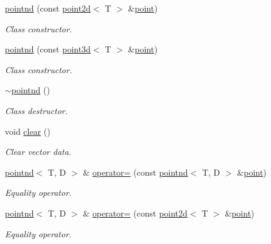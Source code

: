\begin{DoxyCompactItemize}
\hyperlink{classacme_1_1pointnd_a79fb8863dcfbca679747b145dae7f0d8}{pointnd} (const \hyperlink{classacme_1_1point2d}{point2d}$<$ T $>$ \&\hyperlink{classacme_1_1point}{point})
\begin{DoxyCompactList}\small\item\em Class constructor. \end{DoxyCompactList}\item 
\hyperlink{classacme_1_1pointnd_a7f0e5434f15d3f5d2f97ba3d1dbcec6e}{pointnd} (const \hyperlink{classacme_1_1point3d}{point3d}$<$ T $>$ \&\hyperlink{classacme_1_1point}{point})
\begin{DoxyCompactList}\small\item\em Class constructor. \end{DoxyCompactList}\item 
\mbox{\label{classacme_1_1pointnd_a07c983b5a2d653304d6ed0294b8f55b5}} 
\hyperlink{classacme_1_1pointnd_a07c983b5a2d653304d6ed0294b8f55b5}{$\sim$pointnd} ()
\begin{DoxyCompactList}\small\item\em Class destructor. \end{DoxyCompactList}\item 
\mbox{\label{classacme_1_1pointnd_a2d0b84e609dc1ad5cbbe631c5bb5791f}} 
void \hyperlink{classacme_1_1pointnd_a2d0b84e609dc1ad5cbbe631c5bb5791f}{clear} ()
\begin{DoxyCompactList}\small\item\em Clear vector data. \end{DoxyCompactList}\item 
\hyperlink{classacme_1_1pointnd}{pointnd}$<$ T, D $>$ \& \hyperlink{classacme_1_1pointnd_ad4196b71eee0aef40771f864c23e9f13}{operator=} (const \hyperlink{classacme_1_1pointnd}{pointnd}$<$ T, D $>$ \&\hyperlink{classacme_1_1point}{point})
\begin{DoxyCompactList}\small\item\em Equality operator. \end{DoxyCompactList}\item 
\hyperlink{classacme_1_1pointnd}{pointnd}$<$ T, D $>$ \& \hyperlink{classacme_1_1pointnd_a8a548f2642065ade8e0e8666aafc448a}{operator=} (const \hyperlink{classacme_1_1point2d}{point2d}$<$ T $>$ \&\hyperlink{classacme_1_1point}{point})
\begin{DoxyCompactList}\small\item\em Equality operator. \end{DoxyCompactList}\item 

\end{DoxyCompactItemize}
